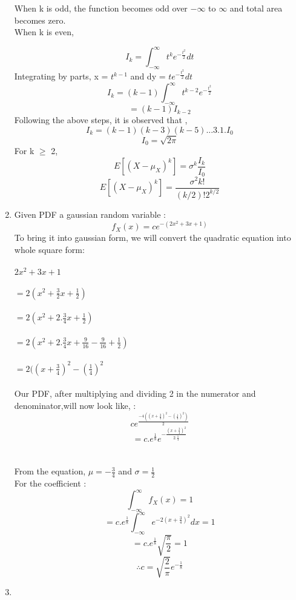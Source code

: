\documentclass{article}
\begin{document}
\begin{enumerate}
  When k is odd, the function becomes odd over $-\infty$ to $\infty$ and total area becomes zero.\\
  When k is even,

  $$I_{k} = \int_{-\infty}^{\infty} t^{k} e^{-\frac{t^2}{2}} dt $$
  Integrating by parts, x = $t^{k-1}$ and dy = $te^{-\frac{t^2}{2}}dt$
  $$I_{k}=(k-1)\int_{-\infty}^{\infty} t^{k-2} e^{-\frac{t^2}{2}} $$
  $$= (k-1)I_{k-2}$$
  Following the above steps, it is observed that ,
  $$I_{k}= (k-1)(k-3)(k-5)...3.1.I_{0}$$
  $$I_{0}=\sqrt{2\pi}$$
  For k $\geq$ 2,
  $$E[(X-\mu_{X})^k] = \sigma^{k} \frac{I_{k}}{I_{0}}$$
  $$E[(X-\mu_{X})^k] = \frac{\sigma^2 k!}{(k/2)!2^{k/2}}$$

  \newpage
\item
  Given PDF  a gaussian random variable :
  $$f_{X}(x)= c e^{-(2x^2+3x+1)}$$
  To bring it into gaussian form, we will convert the quadratic equation into whole square form:\\
  \\
  $2x^2+3x+1$ \\ \\$= 2(x^2+\frac{3}{2}x+\frac{1}{2})$\\ \\
  $=2(x^2+2.\frac{3}{4}x+\frac{1}{2})$\\ \\
  $=2(x^2+2.\frac{3}{4}x+\frac{9}{16}-\frac{9}{16}+\frac{1}{2})$ \\ \\
  $= 2((x+\frac{3}{4})^2 - (\frac{1}{4})^2$ \\ \\
  Our PDF, after multiplying and dividing 2 in the numerator and denominator,will now look like, :\\
  \Large $$c e^{\frac{-4((x+\frac{3}{4})^2 - (\frac{1}{4})^2)}{2}}$$
  $$=c . e^{\frac{1}{8}} e ^{-\frac{(x+\frac{3}{4})^2}{2.\frac{1}{4}}}$$\\
  \\
  \large
  From the equation, $\mu= -\frac{3}{4}$ and $\sigma = \frac{1}{2}$\\
  For the coefficient :
  $$\int_{-\infty}^{\infty} f_{X}(x) =1$$
  $$=c.e^{\frac{1}{8}} \int_{-\infty}^{\infty} e^{-2(x+\frac{3}{4})^2}dx = 1$$
  $$=c.e^{\frac{1}{8}}\sqrt{\frac{\pi}{2}}=1 $$
  $$\therefore c= \sqrt{\frac{2}{\pi}}e^{-\frac{1}{8}}$$
\item


\end{enumerate}
\end{document}
